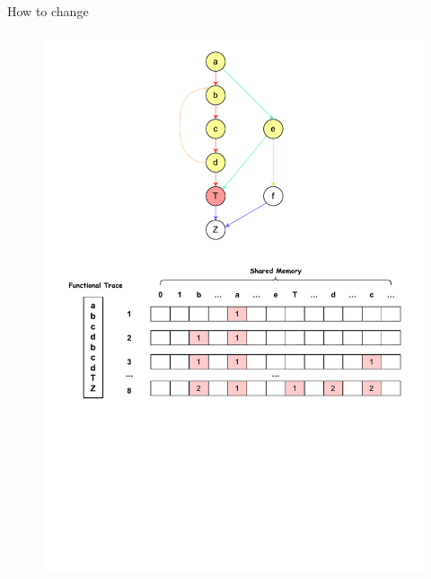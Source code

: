 \documentclass[10pt,aspectratio=43]{beamer}
\begin{document}
\begin{frame}{How to change}
{\begin{figure}[htb]
\begin{minipage}[b]{0.75\textwidth}
                 \includegraphics[width=1\textwidth]{pic/fc2.pdf}
            \end{minipage}
        \end{figure} 
    }
\end{frame}
\end{document}
